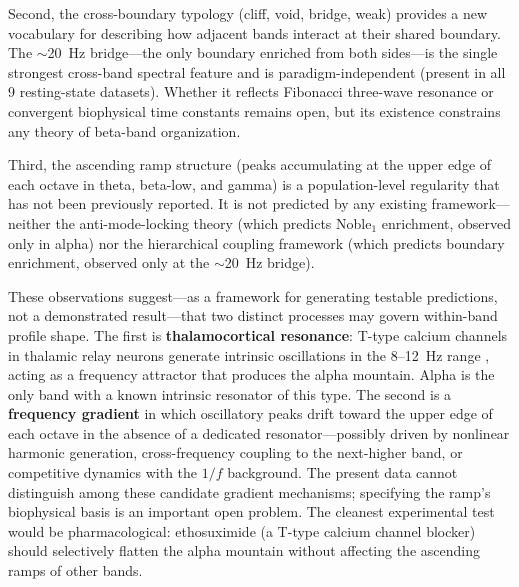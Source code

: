 Second, the cross-boundary typology (cliff, void, bridge, weak) provides a new vocabulary for describing how adjacent bands interact at their shared boundary. The $\sim$20~Hz bridge---the only boundary enriched from both sides---is the single strongest cross-band spectral feature and is paradigm-independent (present in all 9 resting-state datasets). Whether it reflects Fibonacci three-wave resonance \parencite{kramer2023golden,roopun2008period} or convergent biophysical time constants remains open, but its existence constrains any theory of beta-band organization.

Third, the ascending ramp structure (peaks accumulating at the upper edge of each octave in theta, beta-low, and gamma) is a population-level regularity that has not been previously reported. It is not predicted by any existing framework---neither the anti-mode-locking theory \parencite{pletzer2010golden} (which predicts Noble$_1$ enrichment, observed only in alpha) nor the hierarchical coupling framework \parencite{buzsaki2004neuronal} (which predicts boundary enrichment, observed only at the $\sim$20~Hz bridge).

These observations suggest---as a framework for generating testable predictions, not a demonstrated result---that two distinct processes may govern within-band profile shape. The first is \textbf{thalamocortical resonance}: T-type calcium channels in thalamic relay neurons generate intrinsic oscillations in the 8--12~Hz range \parencite{klimesch2018frequency}, acting as a frequency attractor that produces the alpha mountain. Alpha is the only band with a known intrinsic resonator of this type. The second is a \textbf{frequency gradient} in which oscillatory peaks drift toward the upper edge of each octave in the absence of a dedicated resonator---possibly driven by nonlinear harmonic generation, cross-frequency coupling to the next-higher band, or competitive dynamics with the $1/f$ background. The present data cannot distinguish among these candidate gradient mechanisms; specifying the ramp's biophysical basis is an important open problem. The cleanest experimental test would be pharmacological: ethosuximide (a T-type calcium channel blocker) should selectively flatten the alpha mountain without affecting the ascending ramps of other bands.

